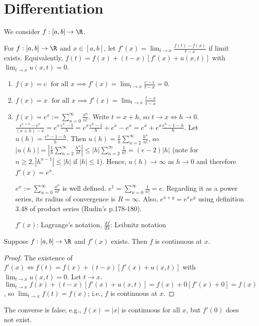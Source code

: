 \chapter{Differentiation}
We consider $f:[a,b]\to \R$.

\begin{definition*}
	For $f: [a,b]\to \R$ and $x \in [a,b]$, let $f'(x)=\lim_{t\to x}{\frac{f(t)-f(x)}{t-x}}$ if limit exists.
	Equivalently, $f(t)=f(x)+(t-x)[f'(x)+u(x,t)]$ with $\lim_{t\to x}{u(x,t)}=0$.
\end{definition*}

\begin{example}
	\begin{enumerate}[label=(\alph*)]
		\item $f(x)=c \; \text{ for all } x \implies f'(x)=\lim_{t\to x}{\frac{c-c}{t-x}}=0$.
		\item $f(x)=x\; \text{ for all }x\implies f'(x)=\lim_{t\to x}{\frac{t-x}{t-x}}$
		\item $f(x)=e^{x}:=\sum_{n=0}^{\infty}{\frac{x^{n}}{n!}}$.
		      Write $t=x+h$, so $t\to x \Leftrightarrow h\to 0$.
		      $\frac{e^{x+h}-e^{x}}{(x+h)-x}=e^{x}\frac{e^{h}-1}{h}=e^{x}\frac{e^{h}-1}{h}+e^{x}-e^{x}=e^{x}+e^{x}\frac{e^{h}-1-h}{h}$.
		      Let $u(h)=\frac{e^{h}-1-h}{h}$. Then $u(h)=\frac{1}{h}\sum_{n=2}^{\infty}{\frac{h^{n}}{n!}}$, so $|u(h)|=|\frac{1}{h}\sum_{n=2}^{\infty}{\frac{h^{n}}{n!}}|\le |h| \sum_{n=2}^{\infty}{\frac{1}{n!}}=(e-2)|h|$ (note for $n\ge 2, |h^{n-1}|\le |h|$ if $|h|\le 1$). Hence, $u(h)\to \infty$ as $h\to 0$ and therefore $f'(x)=e^{x}$.
		      \begin{remark}
			      $e^{x}:=\sum_{n=0}^{\infty}{\frac{x^{n}}{n!}}$ is well defined.
			      $e^{1}=\sum_{n=0}^{\infty}{\frac{1}{n!}}=e$. Regarding it as a power series, its radius of convergence is $R=\infty$. Also, $e^{x+y}=e^{x}e^{y}$ using definition 3.48 of product series (Rudin's p.178-180).
		      \end{remark}
		      \begin{note}
			      $f'(x)$: Lagrange's notation, $\frac{df}{dx}$: Leibnitz notation
		      \end{note}
	\end{enumerate}
\end{example}

\begin{thm}[2]
	Suppose $f:[a,b]\to \R$ and $f'(x)$ exists. Then $f$ is continuous at $x$.
	\begin{proof}
		The existence of $f'(x) \Leftrightarrow f(t)=f(x)+(t-x)[f'(x)+u(x,t)]$ with $\lim_{t\to x}{u(x,t)}=0$. Let $t\to x$. $\lim_{t\to x}{f(x)+(t-x)[f'(x)+u(x,t)]}=f(x)+0[f'(x)+0]=f(x)$, so $\lim_{t\to x}{f(t)}=f(x)$; i.e., $f$ is continuous at $x$.
	\end{proof}
	\begin{remark}
		The converse is false; e.g., $f(x)=|x|$ is continuous for all $x$, but $f'(0)$ does not exist.
	\end{remark}
\end{thm}

